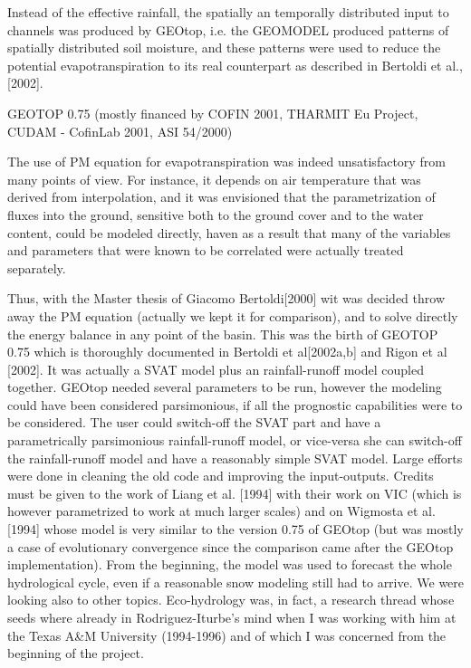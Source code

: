 Instead of the effective rainfall, the spatially an temporally distributed input to channels was produced by GEOtop, i.e. the GEOMODEL produced patterns of spatially distributed soil moisture, and these patterns were used to reduce the potential evapotranspiration to its real counterpart as described in Bertoldi et al., [2002]. 

GEOTOP 0.75
(mostly financed by COFIN 2001, THARMIT Eu Project, CUDAM - CofinLab 2001, ASI 54/2000)

The use of PM  equation for evapotranspiration was indeed unsatisfactory from many points of view. For instance, it depends on air temperature that was derived from interpolation, and it was envisioned that  the parametrization of fluxes into the ground, sensitive both to the ground cover and to the water content, could be modeled directly, haven as a  result that many of the variables and parameters that were known to be correlated were actually treated separately.
 
Thus, with the Master thesis of Giacomo Bertoldi[2000] wit was decided throw away the PM equation (actually we kept it for comparison), and to solve directly the energy balance in any point of the basin. This was the birth of GEOTOP 0.75 which is thoroughly documented in Bertoldi et al[2002a,b] and Rigon et al [2002]. It was actually a SVAT model plus an rainfall-runoff model coupled together. GEOtop needed several parameters to be run, however the modeling could have been considered parsimonious, if all the prognostic capabilities were to be considered.   The user could switch-off the SVAT part and have a parametrically parsimonious rainfall-runoff model, or vice-versa she can switch-off the rainfall-runoff model and have a reasonably simple SVAT model. 
Large efforts were  done in cleaning the old code and improving the input-outputs. Credits must be given to the work of Liang et al. [1994] with their work on VIC (which is however parametrized to work at much larger scales) and on Wigmosta et al. [1994] whose model is very similar to the version 0.75 of GEOtop (but was mostly a case of evolutionary convergence since the comparison came after the GEOtop implementation). 
From the beginning,  the model was used  to forecast the whole hydrological cycle, even if a reasonable snow modeling still had to arrive. We were looking also to other topics. 
 Eco-hydrology was, in fact, a research thread whose seeds where already in Rodriguez-Iturbe's mind when I was working with him at the Texas A\&M University (1994-1996) and of which I was concerned from the beginning of the project. 

